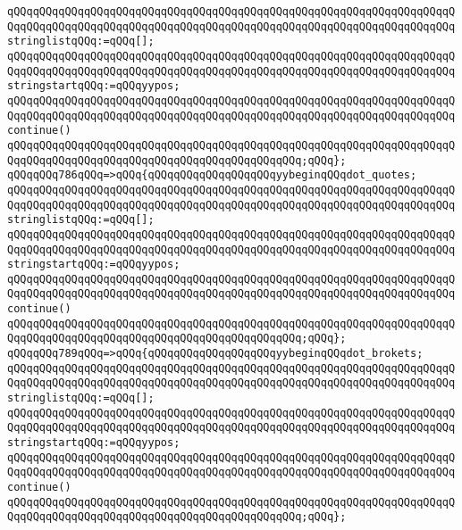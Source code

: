 \verb|qQQqqQQqqQQqqQQqqQQqqQQqqQQqqQQqqQQqqQQqqQQqqQQqqQQqqQQqqQQqqQQqqQQqqQQqqQQqqQQqqQQqqQQqqQQqqQQqqQQqqQQqqQQqqQQqqQQqqQQqqQQqqQQqqQQqqQQqqQQqstringlistqQQq:=qQQq[];|\newline
\verb|qQQqqQQqqQQqqQQqqQQqqQQqqQQqqQQqqQQqqQQqqQQqqQQqqQQqqQQqqQQqqQQqqQQqqQQqqQQqqQQqqQQqqQQqqQQqqQQqqQQqqQQqqQQqqQQqqQQqqQQqqQQqqQQqqQQqqQQqqQQqstringstartqQQq:=qQQqyypos;|\newline
\verb|qQQqqQQqqQQqqQQqqQQqqQQqqQQqqQQqqQQqqQQqqQQqqQQqqQQqqQQqqQQqqQQqqQQqqQQqqQQqqQQqqQQqqQQqqQQqqQQqqQQqqQQqqQQqqQQqqQQqqQQqqQQqqQQqqQQqqQQqqQQqcontinue()|\newline
\verb|qQQqqQQqqQQqqQQqqQQqqQQqqQQqqQQqqQQqqQQqqQQqqQQqqQQqqQQqqQQqqQQqqQQqqQQqqQQqqQQqqQQqqQQqqQQqqQQqqQQqqQQqqQQqqQQqqQQq;qQQq};|\newline
\verb|qQQqqQQq786qQQq=>qQQq{qQQqqQQqqQQqqQQqqQQqyybeginqQQqdot_quotes;|\newline
\verb|qQQqqQQqqQQqqQQqqQQqqQQqqQQqqQQqqQQqqQQqqQQqqQQqqQQqqQQqqQQqqQQqqQQqqQQqqQQqqQQqqQQqqQQqqQQqqQQqqQQqqQQqqQQqqQQqqQQqqQQqqQQqqQQqqQQqqQQqqQQqstringlistqQQq:=qQQq[];|\newline
\verb|qQQqqQQqqQQqqQQqqQQqqQQqqQQqqQQqqQQqqQQqqQQqqQQqqQQqqQQqqQQqqQQqqQQqqQQqqQQqqQQqqQQqqQQqqQQqqQQqqQQqqQQqqQQqqQQqqQQqqQQqqQQqqQQqqQQqqQQqqQQqstringstartqQQq:=qQQqyypos;|\newline
\verb|qQQqqQQqqQQqqQQqqQQqqQQqqQQqqQQqqQQqqQQqqQQqqQQqqQQqqQQqqQQqqQQqqQQqqQQqqQQqqQQqqQQqqQQqqQQqqQQqqQQqqQQqqQQqqQQqqQQqqQQqqQQqqQQqqQQqqQQqqQQqcontinue()|\newline
\verb|qQQqqQQqqQQqqQQqqQQqqQQqqQQqqQQqqQQqqQQqqQQqqQQqqQQqqQQqqQQqqQQqqQQqqQQqqQQqqQQqqQQqqQQqqQQqqQQqqQQqqQQqqQQqqQQqqQQq;qQQq};|\newline
\verb|qQQqqQQq789qQQq=>qQQq{qQQqqQQqqQQqqQQqqQQqyybeginqQQqdot_brokets;|\newline
\verb|qQQqqQQqqQQqqQQqqQQqqQQqqQQqqQQqqQQqqQQqqQQqqQQqqQQqqQQqqQQqqQQqqQQqqQQqqQQqqQQqqQQqqQQqqQQqqQQqqQQqqQQqqQQqqQQqqQQqqQQqqQQqqQQqqQQqqQQqqQQqstringlistqQQq:=qQQq[];|\newline
\verb|qQQqqQQqqQQqqQQqqQQqqQQqqQQqqQQqqQQqqQQqqQQqqQQqqQQqqQQqqQQqqQQqqQQqqQQqqQQqqQQqqQQqqQQqqQQqqQQqqQQqqQQqqQQqqQQqqQQqqQQqqQQqqQQqqQQqqQQqqQQqstringstartqQQq:=qQQqyypos;|\newline
\verb|qQQqqQQqqQQqqQQqqQQqqQQqqQQqqQQqqQQqqQQqqQQqqQQqqQQqqQQqqQQqqQQqqQQqqQQqqQQqqQQqqQQqqQQqqQQqqQQqqQQqqQQqqQQqqQQqqQQqqQQqqQQqqQQqqQQqqQQqqQQqcontinue()|\newline
\verb|qQQqqQQqqQQqqQQqqQQqqQQqqQQqqQQqqQQqqQQqqQQqqQQqqQQqqQQqqQQqqQQqqQQqqQQqqQQqqQQqqQQqqQQqqQQqqQQqqQQqqQQqqQQqqQQqqQQq;qQQq};|\newline
